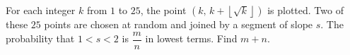 For each integer $k$ from $1$ to $25$, the point $\left(k,\,k+\left\lfloor\sqrt k\right\rfloor\right)$ is plotted. Two of these $25$ points are chosen at random and joined by a segment of slope $s$. The probability that $1<s<2$ is $\dfrac mn$ in lowest terms. Find $m+n$.
